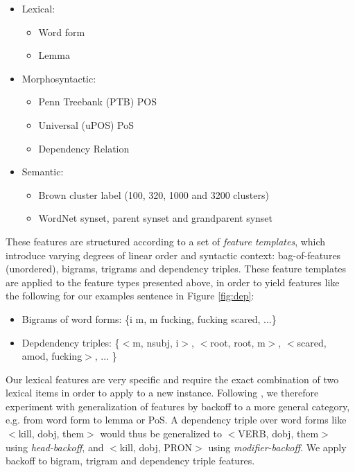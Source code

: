 \documentclass[11pt,letterpaper]{article}
\begin{document}
\begin{itemize}[noitemsep]
\item Lexical:
  \begin{itemize}[noitemsep]
  \item Word form
  \item Lemma
  \end{itemize}
  
\item Morphosyntactic:
  \begin{itemize}[noitemsep]
  \item Penn Treebank (PTB) POS
  \item Universal (uPOS) PoS
  \item Dependency Relation
  \end{itemize}
  
\item Semantic:
  \begin{itemize}[noitemsep]
    \item Brown cluster label (100, 320, 1000 and 3200 clusters)
    \item WordNet synset, parent synset and grandparent synset
  \end{itemize}
\end{itemize}


These features are structured according to a set of \emph{feature templates}, which introduce varying degrees of linear order and syntactic context: bag-of-features (unordered), bigrams, trigrams and dependency triples. These feature templates are applied to the feature types presented above, in order to yield features like the following for our examples sentence in Figure \ref{fig:dep}:

\begin{itemize}
\setlength\itemsep{0em}
\item Bigrams of word forms: \{i m,  m fucking, fucking scared, ...\}

\item Depdendency triples: \{$<$m, nsubj, i$>$, $<$root, root, m$>$, $<$scared, amod, fucking$>$, ... \}
\end{itemize}
Our lexical features are very specific and require the exact combination of two lexical items in order to apply to a new instance. Following , we therefore experiment with generalization of features by backoff to a more general category, e.g. from word form to lemma or PoS. A dependency triple over word forms like $<$kill, dobj, them$>$ would thus be generalized to $<$VERB, dobj, them$>$ using \emph{head-backoff}, and $<$kill, dobj, PRON$>$ using \emph{modifier-backoff}. We apply backoff to bigram, trigram and dependency triple features.
\end{document}
